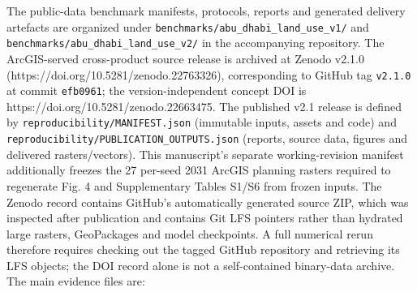 The public-data benchmark manifests, protocols, reports and generated
delivery artefacts are organized under
\texttt{benchmarks/abu\_dhabi\_land\_use\_v1/} and
\texttt{benchmarks/abu\_dhabi\_land\_use\_v2/} in the accompanying
repository. The ArcGIS-served cross-product source release is archived
at Zenodo v2.1.0 (https://doi.org/10.5281/zenodo.22763326),
corresponding to GitHub tag \texttt{v2.1.0} at commit \texttt{efb0961};
the version-independent concept DOI is
https://doi.org/10.5281/zenodo.22663475. The published v2.1 release is
defined by \texttt{reproducibility/MANIFEST.json} (immutable inputs,
assets and code) and \texttt{reproducibility/PUBLICATION\_OUTPUTS.json}
(reports, source data, figures and delivered rasters/vectors). This
manuscript's separate working-revision manifest additionally freezes the
27 per-seed 2031 ArcGIS planning rasters required to regenerate Fig. 4
and Supplementary Tables S1/S6 from frozen inputs. The Zenodo record
contains GitHub's automatically generated source ZIP, which was
inspected after publication and contains Git LFS pointers rather than
hydrated large rasters, GeoPackages and model checkpoints. A full
numerical rerun therefore requires checking out the tagged GitHub
repository and retrieving its LFS objects; the DOI record alone is not a
self-contained binary-data archive. The main evidence files are:


